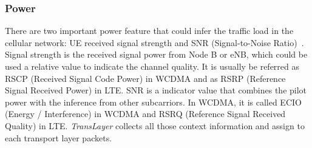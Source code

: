 \subsubsection{Power}
There are two important power feature that could infer the traffic load in the cellular network: UE received signal strength and SNR (Signal-to-Noise Ratio)~\cite{loadsense}. Signal strength is the received signal power from Node B or eNB, which could be used a relative value to indicate the channel quality. It is usually be referred as RSCP (Received Signal Code Power) in WCDMA and as RSRP (Reference Signal Received Power) in LTE. SNR is a indicator value that combines the pilot power with the inference from other subcarriors. In WCDMA, it is called ECIO (Energy / Interference) in WCDMA and RSRQ (Reference Signal Received Quality) in LTE. \textit{TransLayer} collects all those context information and assign to each transport layer packets.




